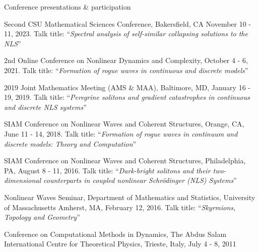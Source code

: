 \documentclass[10pt]{article} %
\begin{document}
\begin{section}{Conference presentations \& participation}
\begin{etaremune}
\setlength\itemsep{1em}


\item \vskip -6.2mm Second CSU Mathematical Sciences Conference, Bakersfield, CA November 10 - 11, 2023.
Talk title: ``\textit{Spectral analysis of self-similar collapsing solutions to the NLS}''

\item  2nd Online Conference on Nonlinear Dynamics and Complexity, October 4 - 6, 2021.
Talk title: ``\textit{Formation of rogue waves in continuous and discrete models}''
                         
\item
2019 Joint Mathematics Meeting (AMS \& MAA), Baltimore, MD, January 16 - 19, 2019.  
                         Talk title: ``\textit{Peregrine solitons and gradient catastrophes in continuous
                         and discrete NLS systems}''

\item SIAM Conference on Nonlinear Waves and Coherent Structures, Orange, CA, June 11 - 14, 2018.
      Talk title: ``\textit{Formation of rogue waves in continuum and discrete models: Theory and
      Computation}''

\item  SIAM Conference on Nonlinear Waves and Coherent Structures, Philadelphia, PA, August 8 - 11, 2016.
       Talk title: ``\textit{Dark-bright solitons and their two-dimensional counterparts in coupled nonlinear 
       Schr\"odinger (NLS) Systems}''

\item Nonlinear Waves Seminar, Department of Mathematics and Statistics, University of Massachusetts Amherst, 
      MA, February 12, 2016.
      Talk title: ``\textit{Skyrmions, Topology and Geometry}''

\item  Conference on Computational Methods in Dynamics, The Abdus Salam International Centre for
       Theoretical Physics, Trieste, Italy, July 4 - 8, 2011


\end{etaremune}
\end{section}
\end{document}
